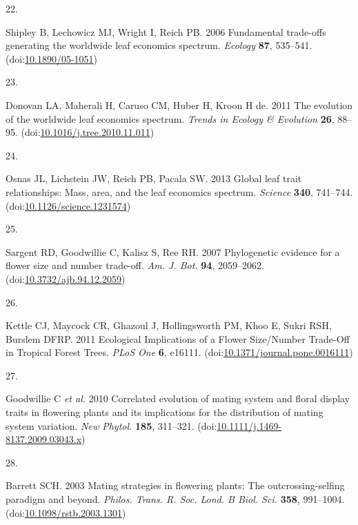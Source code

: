 \documentclass[
  12pt,
  a4paper,
]{article}
\newlength{\cslhangindent}
\newlength{\csllabelwidth}
\newlength{\cslentryspacingunit} %
\newenvironment{CSLReferences}[2] %
 {%
  \setlength{\parindent}{0pt}
  \ifodd #1
  \let\oldpar\par
  \def\par{\hangindent=\cslhangindent\oldpar}
  \fi
  \setlength{\parskip}{#2\cslentryspacingunit}
 }%
 {}
\newcommand{\CSLLeftMargin}[1]{\parbox[t]{\csllabelwidth}{#1}}
\newcommand{\CSLRightInline}[1]{\parbox[t]{\linewidth - \csllabelwidth}{#1}\break}
\begin{document}
\begin{CSLReferences}{0}{0}
\leavevmode{}%
\CSLLeftMargin{22. }
\CSLRightInline{Shipley B, Lechowicz MJ, Wright I, Reich PB. 2006 Fundamental trade-offs generating the worldwide leaf economics spectrum. \emph{Ecology} \textbf{87}, 535--541. (doi:\href{https://doi.org/10.1890/05-1051}{10.1890/05-1051})}

\leavevmode{}%
\CSLLeftMargin{23. }
\CSLRightInline{Donovan LA, Maherali H, Caruso CM, Huber H, Kroon H de. 2011 The evolution of the worldwide leaf economics spectrum. \emph{Trends in Ecology \& Evolution} \textbf{26}, 88--95. (doi:\href{https://doi.org/10.1016/j.tree.2010.11.011}{10.1016/j.tree.2010.11.011})}

\leavevmode{}%
\CSLLeftMargin{24. }
\CSLRightInline{Osnas JL, Lichstein JW, Reich PB, Pacala SW. 2013 Global leaf trait relationships: Mass, area, and the leaf economics spectrum. \emph{Science} \textbf{340}, 741--744. (doi:\href{https://doi.org/10.1126/science.1231574}{10.1126/science.1231574})}

\leavevmode{}%
\CSLLeftMargin{25. }
\CSLRightInline{Sargent RD, Goodwillie C, Kalisz S, Ree RH. 2007 Phylogenetic evidence for a flower size and number trade-off. \emph{Am. J. Bot.} \textbf{94}, 2059--2062. (doi:\href{https://doi.org/10.3732/ajb.94.12.2059}{10.3732/ajb.94.12.2059})}

\leavevmode{}%
\CSLLeftMargin{26. }
\CSLRightInline{Kettle CJ, Maycock CR, Ghazoul J, Hollingsworth PM, Khoo E, Sukri RSH, Burslem DFRP. 2011 Ecological {Implications} of a {Flower Size}/{Number Trade}-{Off} in {Tropical Forest Trees}. \emph{PLoS One} \textbf{6}, e16111. (doi:\href{https://doi.org/10.1371/journal.pone.0016111}{10.1371/journal.pone.0016111})}

\leavevmode{}%
\CSLLeftMargin{27. }
\CSLRightInline{Goodwillie C \emph{et al.} 2010 Correlated evolution of mating system and floral display traits in flowering plants and its implications for the distribution of mating system variation. \emph{New Phytol.} \textbf{185}, 311--321. (doi:\href{https://doi.org/10.1111/j.1469-8137.2009.03043.x}{10.1111/j.1469-8137.2009.03043.x})}

\leavevmode{}%
\CSLLeftMargin{28. }
\CSLRightInline{Barrett SCH. 2003 Mating strategies in flowering plants: The outcrossing-selfing paradigm and beyond. \emph{Philos. Trans. R. Soc. Lond. B Biol. Sci.} \textbf{358}, 991--1004. (doi:\href{https://doi.org/10.1098/rstb.2003.1301}{10.1098/rstb.2003.1301})}


\end{CSLReferences}
\end{document}
